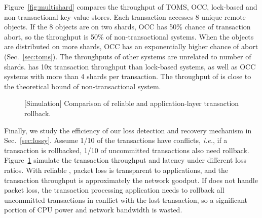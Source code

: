 Figure~\ref{fig:multishard} compares the throughput of TOMS, OCC, lock-based and non-transactional key-value stores.
Each transaction accesses 8 unique remote objects.
If the 8 objects are on two shards, OCC has 50\% chance of transaction abort, so the throughput is 50\% of non-transactional systems. When the objects are distributed on more shards, OCC has an exponentially higher chance of abort (Sec.~\ref{sec:toms}). The throughputs of other systems are unrelated to number of shards. \sys has 10x transaction throughput than lock-based systems, as well as OCC systems with more than 4 shards per transaction. The throughput of \sys is close to the theoretical bound of non-transactional system.



\begin{figure}[t]
\centering
	\hspace{0.01\textwidth}
\caption{[Simulation] Comparison of reliable \sys and application-layer transaction rollback.}
\label{fig:ycsb-loss}
\end{figure}

Finally, we study the efficiency of our loss detection and recovery mechanism in Sec.~\ref{sec:lossy}.
Assume 1/10 of the transactions have conflicts, \textit{i.e.}, if a transaction is rollbacked, 1/10 of uncommitted transactions also need rollback.
Figure~\ref{fig:ycsb-loss} simulate the transaction throughput and latency under different loss ratios. With reliable \sys, packet loss is transparent to applications, and the transaction throughput is approximately the network goodput. If \sys does not handle packet loss, the transaction processing application needs to rollback all uncommitted transactions in conflict with the lost transaction, so a significant portion of CPU power and network bandwidth is wasted.

